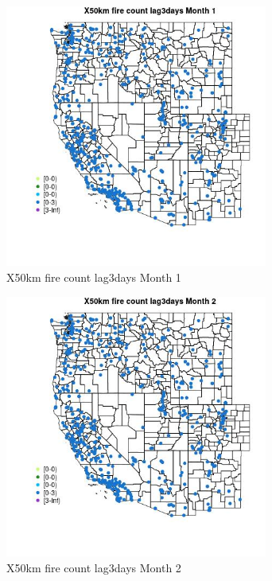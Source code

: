 \begin{figure} 
\centering  
\includegraphics[width=0.77\textwidth]{Code_Outputs/Report_ML_input_PM25_Step4_part_e_de_duplicated_aves_compiled_2019-05-14wNAs_MapObsMo1X50km_fire_count_lag3days.jpg} 
\caption{\label{fig:Report_ML_input_PM25_Step4_part_e_de_duplicated_aves_compiled_2019-05-14wNAsMapObsMo1X50km_fire_count_lag3days}X50km fire count lag3days Month 1} 
\end{figure} 
 

\begin{figure} 
\centering  
\includegraphics[width=0.77\textwidth]{Code_Outputs/Report_ML_input_PM25_Step4_part_e_de_duplicated_aves_compiled_2019-05-14wNAs_MapObsMo2X50km_fire_count_lag3days.jpg} 
\caption{\label{fig:Report_ML_input_PM25_Step4_part_e_de_duplicated_aves_compiled_2019-05-14wNAsMapObsMo2X50km_fire_count_lag3days}X50km fire count lag3days Month 2} 
\end{figure} 
 

